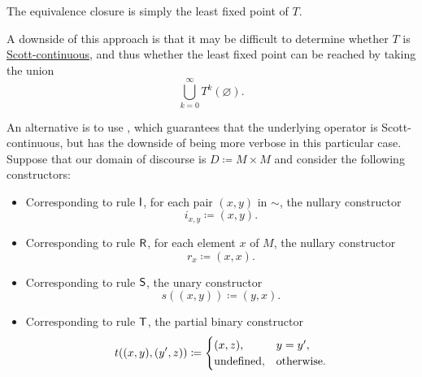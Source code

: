 \begin{example}
  The equivalence closure is simply the least fixed point of \( T \).

  A downside of this approach is that it may be difficult to determine whether \( T \) is \hyperref[def:scott_continuity]{Scott-continuous}, and thus whether the least fixed point can be reached by taking the union
  \begin{equation*}
    \bigcup_{k=0}^\infty T^k(\varnothing).
  \end{equation*}

  An alternative is to use , which guarantees that the underlying operator is Scott-continuous, but has the downside of being more verbose in this particular case. Suppose that our domain of discourse is \( D \coloneqq M \times M \) and consider the following constructors:
  \begin{itemize}
    \item Corresponding to rule \( \textsf{I} \), for each pair \( (x, y) \) in \( {\sim} \), the nullary constructor
    \begin{equation*}
      i_{x,y} \coloneqq (x, y).
    \end{equation*}

    \item Corresponding to rule \( \textsf{R} \), for each element \( x \) of \( M \), the nullary constructor
    \begin{equation*}
      r_x \coloneqq (x, x).
    \end{equation*}

    \item Corresponding to rule \( \textsf{S} \), the unary constructor
    \begin{equation*}
      s((x, y)) \coloneqq (y, x).
    \end{equation*}

    \item Corresponding to rule \( \textsf{T} \), the partial binary constructor
    \begin{equation*}
      t((x, y), (y', z)) \coloneqq \begin{cases}
        (x, z),        &y = y', \\
        \T{undefined}, &\T{otherwise.} \\
      \end{cases}
    \end{equation*}
  \end{itemize}
\end{example}

